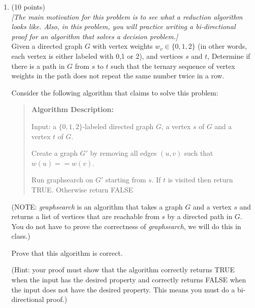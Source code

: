 \documentclass[10pt,letterpaper,unboxed,cm]{article}
\begin{document}
\begin{enumerate}
\begin{enumerate}
(3 points)
Assuming that matrix multiplication between two $n\times n$ matrices takes $O(n^{2.81})$ time, calculate the runtime of this algorithm. 

\item
(3 points)
In order for \emph{Triangle2} to return True, what needs to happen and why does this correspond to a triangle? (In particular, what does it mean for $H[i,j] = 1$ or $H[i,j] = 2$?)

\item
(3 points)
Is \emph{Triangle1} or \emph{Triangle2} more efficient? (Justify your answer.) (Hint: think about dense and sparse graphs.)
\end{enumerate}




\item (10 points) \\
\emph{[The main motivation for this problem is to see what a \emph{reduction} algorithm looks like. Also, in this problem, you will practice writing a bi-directional proof for an algorithm that solves a decision problem.]}\\
Given a directed graph $G$ with vertex weights $w_v\in\{0,1,2\}$ (in other words, each vertex is either labeled with 0,1 or 2), and vertices $s$ and $t$, 
Determine if there is a path in $G$ from $s$ to $t$ such that the ternary sequence of vertex weights in the path does not repeat the same number twice in a row.

Consider the following algorithm that claims to solve this problem: 

\begin{quote}
{\bf Algorithm Description:}

Input: a $\{0,1,2\}$-labeled directed graph $G$, a vertex $s$ of $G$ and a vertex $t$ of $G$.

Create a graph $G'$ by removing all edges $(u,v)$ such that $w(u) == w(v)$.

Run graphsearch on $G'$ starting from $s$. If $t$ is visited then return TRUE. Otherwise return FALSE

\end{quote}




(NOTE: \emph{graphsearch} is an algorithm that takes a graph $G$ and a vertex $s$ and returns a list of vertices that are reachable from $s$ by a directed path in $G$.
You do not have to prove the correctness of \emph{graphsearch}, we will do this in class.)



Prove that this algorithm is correct.

(Hint: your proof must show that the algorithm correctly returns TRUE when the input has the desired property and correctly returns FALSE when the input does not have the desired property. This means you must do a bi-directional proof.)











\end{enumerate}
\end{document}
